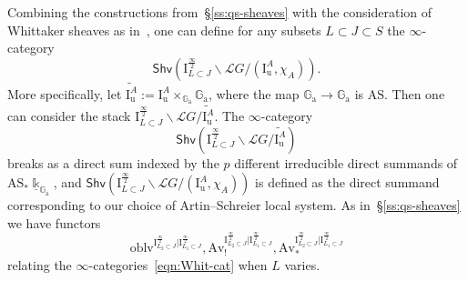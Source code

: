 \documentclass[11pt]{amsart}
\numberwithin{equation}{section}
\theoremstyle{plain}
\theoremstyle{definition}
\newcommand{\I}{{\mathrm I}}
\renewcommand{\k}{\Bbbk}
\newcommand{\sL}{{\mathcal L}}
\newcommand{\X}{{\mathbb X}}
\newcommand{\Xd}{\check{\X}}
\newcommand{\Ga}{{\mathbb{G}_{\mathrm{a}}}}
\newcommand{\Ad}{\mathrm{Ad}}
\newcommand{\semi}{{{\frac{\infty}{2}}}}
\newcommand{\quar}{{{\frac{\infty}{4}}}}
\newcommand{\oblv}{\mathrm{oblv}}
\newcommand{\Av}{\mathrm{Av}}
\newcommand{\Shv}{\mathsf{Shv}}
\newcommand{\Gr}{\mathrm{Gr}}
\newcommand{\Iu}{\mathrm{I}_{\mathrm{u}}}
\newcommand{\comp}{\mathrm{c}}
\begin{document}
Combining the constructions from~\S\ref{ss:qs-sheaves} with the consideration of Whittaker shea\-ves as in~\cite[End of~\S 4.2]{zhu},
one can define for any subsets $L \subset J \subset S$ the $\infty$-category
\begin{equation}
\label{eqn:Whit-cat}
\Shv \left( \I_{L \subset J}^{\semi}\backslash \sL G/(\Iu^A,\chi_A) \right). 
\end{equation}
More specifically, let $\widetilde{\Iu^A} := \Iu^A \times_{\Ga} \Ga$, where the map $\Ga \to \Ga$ is $\mathrm{AS}$. Then one can consider the stack $\I_{L \subset J}^\semi \backslash \sL G / \widetilde{\Iu^A}$. The $\infty$-category
\[
\Shv \left( \I_{L \subset J}^\semi \backslash \sL G / \widetilde{\Iu^A} \right)
\]
breaks as a direct sum indexed by the $p$ different irreducible direct summands of $\mathrm{AS}_* \underline{\k}_{\Ga}$, and $\Shv \left( \I_{L \subset J}^{\semi}\backslash \sL G/(\Iu^A,\chi_A) \right)$ is defined as the direct summand corresponding to our choice of Artin--Schreier local system. As in~\S\ref{ss:qs-sheaves} we have functors
\[
\oblv^{\I_{L_2 \subset J}^{\semi}|\I_{L_1 \subset J}^{\semi}}, \Av_!^{\I_{L_2 \subset J}^{\semi}|\I_{L_1 \subset J}^{\semi}}, \Av_*^{\I_{L_2 \subset J}^{\semi}|\I_{L_1 \subset J}^{\semi}}
\]
relating the $\infty$-categories~\eqref{eqn:Whit-cat} when $L$ varies.
\end{document}
